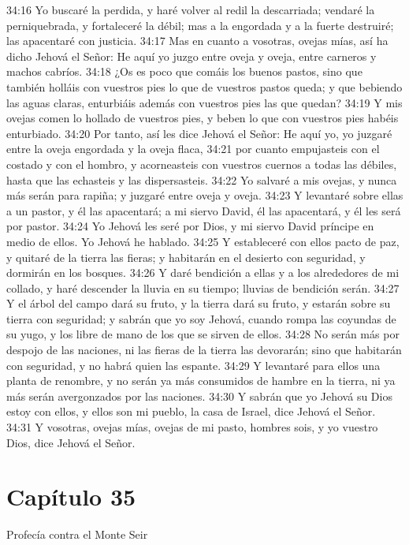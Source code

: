 34:16 Yo buscaré la perdida, y haré volver al redil la descarriada; vendaré la perniquebrada, y fortaleceré la débil; mas a la engordada y a la fuerte destruiré; las apacentaré con justicia.   
34:17 Mas en cuanto a vosotras, ovejas mías, así ha dicho Jehová el Señor: He aquí yo juzgo entre oveja y oveja, entre carneros y machos cabríos.   
34:18 ¿Os es poco que comáis los buenos pastos, sino que también holláis con vuestros pies lo que de vuestros pastos queda; y que bebiendo las aguas claras, enturbiáis además con vuestros pies las que quedan?   
34:19 Y mis ovejas comen lo hollado de vuestros pies, y beben lo que con vuestros pies habéis enturbiado.   
34:20 Por tanto, así les dice Jehová el Señor: He aquí yo, yo juzgaré entre la oveja engordada y la oveja flaca,   
34:21 por cuanto empujasteis con el costado y con el hombro, y acorneasteis con vuestros cuernos a todas las débiles, hasta que las echasteis y las dispersasteis.   
34:22 Yo salvaré a mis ovejas, y nunca más serán para rapiña; y juzgaré entre oveja y oveja.   
34:23 Y levantaré sobre ellas a un pastor, y él las apacentará; a mi siervo David, él las apacentará, y él les será por pastor. 
34:24 Yo Jehová les seré por Dios, y mi siervo David príncipe en medio de ellos. Yo Jehová he hablado.   
34:25 Y estableceré con ellos pacto de paz, y quitaré de la tierra las fieras; y habitarán en el desierto con seguridad, y dormirán en los bosques.   
34:26 Y daré bendición a ellas y a los alrededores de mi collado, y haré descender la lluvia en su tiempo; lluvias de bendición serán.   
34:27 Y el árbol del campo dará su fruto, y la tierra dará su fruto, y estarán sobre su tierra con seguridad; y sabrán que yo soy Jehová, cuando rompa las coyundas de su yugo, y los libre de mano de los que se sirven de ellos.   
34:28 No serán más por despojo de las naciones, ni las fieras de la tierra las devorarán; sino que habitarán con seguridad, y no habrá quien las espante.   
34:29 Y levantaré para ellos una planta de renombre, y no serán ya más consumidos de hambre en la tierra, ni ya más serán avergonzados por las naciones.   
34:30 Y sabrán que yo Jehová su Dios estoy con ellos, y ellos son mi pueblo, la casa de Israel, dice Jehová el Señor.   
34:31 Y vosotras, ovejas mías, ovejas de mi pasto, hombres sois, y yo vuestro Dios, dice Jehová el Señor.   
\section*{Capítulo 35 } 
Profecía contra el Monte Seir   
  
